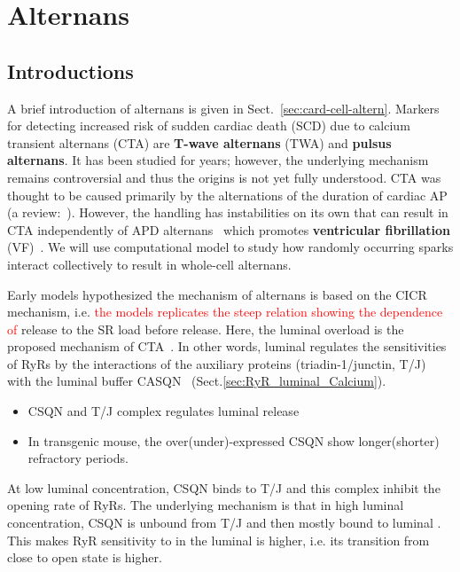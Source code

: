  
\chapter{Alternans}
\label{chap:alternans}


\section{Introductions}
\label{sec:introductions}


A brief introduction of alternans is given in
Sect.~\ref{sec:card-cell-altern}. Markers for detecting increased risk of
sudden cardiac death (SCD) due to calcium transient alternans (CTA) are
 {\bf T-wave alternans} (TWA) and {\bf pulsus alternans}. It has been  studied
 for years; however, the underlying mechanism remains  controversial and thus
 the origins is not yet fully understood. CTA  was thought to be caused
 primarily by the alternations of the duration  of cardiac AP (a
 review:~\citep{myles2008}).  However, the   handling has
 instabilities on its own that can result in CTA  independently of APD
 alternans~\citep{chudin1999icd} which promotes  {\bf ventricular fibrillation}
(VF)~\citep{adam1984,smith1988,nearing1991}.  We will use
computational model to study how randomly occurring  sparks
interact collectively to result in whole-cell  alternans.

Early models hypothesized the mechanism of  alternans is
based on the CICR mechanism, i.e.
\textcolor{red}{the models replicates the steep relation showing the
  dependence of}  release to the SR  load before
  release.
Here, the luminal  overload is the proposed mechanism of
CTA~\citep{diaz2004src}. In other words, luminal  regulates
the sensitivities of RyRs by the interactions of the auxiliary
proteins (triadin-1/junctin, T/J) with the luminal  buffer
CASQN~\citep{terentyev2003cdf,Gyorke2004,knollmann2006cdc}
(Sect.\ref{sec:RyR_luminal_Calcium}).
\begin{itemize}
\item CSQN and T/J complex regulates luminal  release
\item In transgenic mouse, the over(under)-expressed CSQN show
  longer(shorter) refractory periods. 
\end{itemize}
At low luminal concentration, CSQN binds to T/J and this complex
inhibit the opening rate of RyRs. The underlying mechanism is that in
high luminal  concentration, CSQN is unbound from T/J and
then mostly bound to luminal .  This makes RyR sensitivity
to  in the luminal is higher, i.e. its transition from close
to open state is higher.


